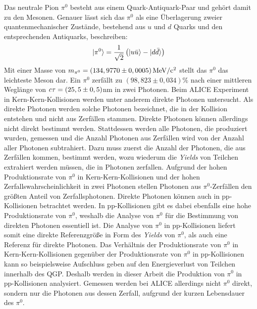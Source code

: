 Das neutrale Pion $\pi^{0}$ besteht aus einem Quark-Antiquark-Paar und gehört damit zu den Mesonen.
Genauer lässt sich das $\pi^{0}$ als eine Überlagerung zweier quantenmechanischer Zustände, bestehend aus $u$ und $d$ Quarks und den entsprechenden Antiquarks, beschreiben:
\begin{align}
\lvert\pi^{0}\rangle = \frac{1}{\sqrt{2}}\left(\lvert u\bar{u}\rangle-\lvert d\bar{d}\rangle\right) \label{eq:pi0state}
\end{align}
Mit einer Masse von $m_{\pi^{0}} = \left(134,9770\pm0,0005\right) \rm{MeV}/c^{2}$ \cite{book:pdg} stellt das $\pi^{0}$ das leichteste Meson dar.
Ein ${\pi^{0}}$ zerf{ä}llt zu $\left( 98,823\pm0,034\right)\%$ nach einer mittleren Weglänge von ${\it c\tau} = (25,5\pm0,5)$nm \cite{book:pdg} in zwei Photonen.
\newline
Beim ALICE Experiment in Kern-Kern-Kollisionen werden unter anderem direkte Photonen untersucht.
Als direkte Photonen werden solche Photonen bezeichnet, die in der Kollision entstehen und nicht aus Zerfällen stammen.
Direkte Photonen können allerdings nicht direkt bestimmt werden.
Stattdessen werden alle Photonen, die produziert wurden, gemessen und die Anzahl Photonen aus Zerfällen wird von der Anzahl aller Photonen subtrahiert.
Dazu muss zuerst die Anzahl der Photonen, die aus Zerfällen kommen, bestimmt werden, wozu wiederum die \textit{Yields} von Teilchen extrahiert werden müssen, die in Photonen zerfallen.
Aufgrund der hohen Produktionsrate von $\pi^{0}$ in Kern-Kern-Kollisionen und der hohen Zerfallswahrscheinlichkeit in zwei Photonen stellen Photonen aus $\pi^{0}$-Zerfällen den größten Anteil von Zerfallsphotonen.
\newline
Direkte Photonen können auch in pp-Kollisionen betrachtet werden.
In pp-Kollisionen gibt es dabei ebenfalls eine hohe Produktionsrate von $\pi^{0}$, weshalb die Analyse von $\pi^{0}$ für die Bestimmung von direkten Photonen essentiell ist.
Die Analyse von $\pi^{0}$ in pp-Kollisionen liefert somit eine direkte Referenzgröße in Form des \textit{Yields} von $\pi^{0}$, als auch eine Referenz für direkte Photonen.
Das Verhältnis der Produktionsrate von $\pi^{0}$ in Kern-Kern-Kollisionen gegenüber der Produktionsrate von $\pi^{0}$ in pp-Kollisionen kann so beispielsweise Aufschluss geben auf den Energieverlust von Teilchen innerhalb des QGP.
Deshalb werden in dieser Arbeit die Produktion von $\pi^{0}$ in pp-Kollisionen analysiert.
\newline
Gemessen werden bei ALICE allerdings nicht $\pi^{0}$ direkt, sondern nur die Photonen aus dessen Zerfall, aufgrund der kurzen Lebensdauer des $\pi^{0}$.
